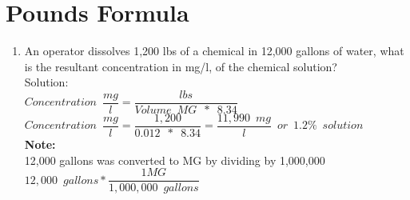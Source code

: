 \section{Pounds Formula}
\begin{enumerate}
\item An operator dissolves 1,200 lbs of a chemical in 12,000 gallons of water, what is the resultant concentration in mg/l, of the chemical solution?\\
Solution:\\
$Concentration \enspace \dfrac{mg}{l}=\dfrac{lbs}{Volume \enspace MG \enspace * \enspace 8.34}$\\
$Concentration \enspace \dfrac{mg}{l}=\dfrac{1,200}{0.012 \enspace * \enspace 8.34}=\boxed{\dfrac{11,990 \enspace mg}{l} \enspace or \enspace 1.2\% \enspace solution}$\\
\textbf{Note:}\\  
12,000 gallons was converted to MG by dividing by 1,000,000\\
$12,000 \enspace gallons * \dfrac{1 MG}{1,000,000 \enspace gallons}$\\
\end{enumerate}
